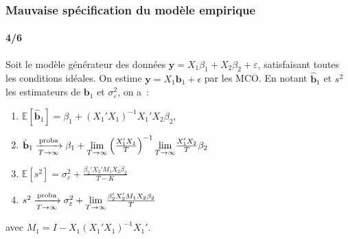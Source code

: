 \documentclass[10pt]{beamer}
\begin{document}
\begin{frame}
  \frametitle{Mauvaise spécification du modèle empirique}
  \framesubtitle{4/6}

  \begin{prop}\label{prop:mispecification}
    Soit le modèle générateur des données $\mathbf y = X_1\beta_1 + X_2\beta_2 + \varepsilon$,
    satisfaisant toutes les conditions idéales. On estime
    $\mathbf y = X_1\mathbf b_1 + \epsilon$ par les MCO. En notant $\hat{\mathbf b}_1$
    et $s^2$ les estimateurs de $\mathbf b_1$ et $\sigma_{\varepsilon}^2$, on a~:
    \begin{enumerate}

    \item $\mathbb E\left[ \hat{\mathbf b}_1 \right] = \beta_1 + (X_1'X_1)^{-1}X_1'X_2\beta_2$,
    \item $\hat{\mathbf b}_1 \xrightarrow[T\rightarrow\infty]{\text{proba}} \beta_1 + \underset{T\rightarrow\infty}{\lim}\left(\frac{X_1'X_1}{T}\right)^{-1}\underset{T\rightarrow\infty}{\lim}\frac{X_1'X_2}{T}\beta_2$
    \item $\mathbb E\left[s^2\right] = \sigma_{\varepsilon}^2  + \frac{\beta_2'X_2'M_1X_2\beta_2}{T-K}$
    \item $s^2 \xrightarrow[T\rightarrow\infty]{\text{proba}} \sigma_{\varepsilon}^2 + \underset{T\rightarrow\infty}{\lim}\frac{\beta_2'X_2'M_1X_2\beta_2}{T}$
    \end{enumerate}
    avec $M_1 = I-X_1(X_1'X_1)^{-1}X_1'$.
  \end{prop}

\end{frame}
\end{document}
